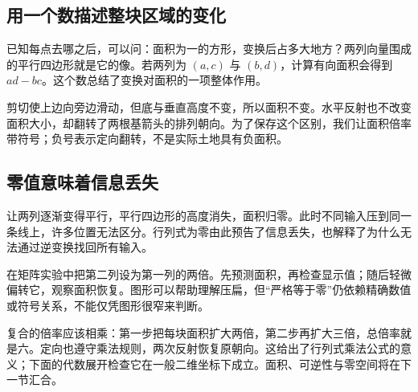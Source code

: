 \subsection*{用一个数描述整块区域的变化}
已知每点去哪之后，可以问：面积为一的方形，变换后占多大地方？两列向量围成的平行四边形就是它的像。若两列为 $(a,c)$ 与 $(b,d)$，计算有向面积会得到 $ad-bc$。这个数总结了变换对面积的一项整体作用。

剪切使上边向旁边滑动，但底与垂直高度不变，所以面积不变。水平反射也不改变面积大小，却翻转了两根基箭头的排列朝向。为了保存这个区别，我们让面积倍率带符号；负号表示定向翻转，不是实际土地具有负面积。

\subsection*{零值意味着信息丢失}
让两列逐渐变得平行，平行四边形的高度消失，面积归零。此时不同输入压到同一条线上，许多位置无法区分。行列式为零由此预告了信息丢失，也解释了为什么无法通过逆变换找回所有输入。

在矩阵实验中把第二列设为第一列的两倍。先预测面积，再检查显示值；随后轻微偏转它，观察面积恢复。图形可以帮助理解压扁，但“严格等于零”仍依赖精确数值或符号关系，不能仅凭图形很窄来判断。

复合的倍率应该相乘：第一步把每块面积扩大两倍，第二步再扩大三倍，总倍率就是六。定向也遵守乘法规则，两次反射恢复原朝向。这给出了行列式乘法公式的意义；下面的代数展开检查它在一般二维坐标下成立。面积、可逆性与零空间将在下一节汇合。
